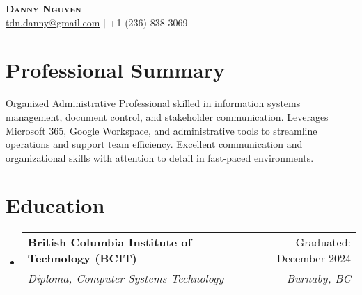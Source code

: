 \documentclass[letterpaper,11pt]{article}
\makeatletter
\newcommand{\resumeSubheading}[4]{
\vspace{-2pt}\item
\begin{tabular*}{0.97\textwidth}[t]{l@{\extracolsep{\fill}}r}
\textbf{#1} & #2 \\
\textit{\small#3} & \textit{\small #4} \\
\end{tabular*}\vspace{-7pt}
}
\newcommand{\resumeSubHeadingListStart}{\begin{itemize}[leftmargin=0.15in, label={}]}
\newcommand{\resumeSubHeadingListEnd}{\end{itemize}}
\makeatother
\begin{document}
\begin{center}
{\LARGE \textbf{\scshape Danny Nguyen}} \\ \vspace{1pt}
\small \href{mailto:tdn.danny@gmail.com}{\underline{tdn.danny@gmail.com}} $|$ +1 (236) 838-3069
\end{center}


\section{Professional Summary} %
\small Organized Administrative Professional skilled in information systems management, document control, and stakeholder communication. Leverages Microsoft 365, Google Workspace, and administrative tools to streamline operations and support team efficiency. Excellent communication and organizational skills with attention to detail in fast-paced environments.

\section{Education}
\resumeSubHeadingListStart
\resumeSubheading{British Columbia Institute of Technology (BCIT)}{Graduated: December 2024}{Diploma, Computer Systems Technology}{Burnaby, BC}
\resumeSubHeadingListEnd
\end{document}
